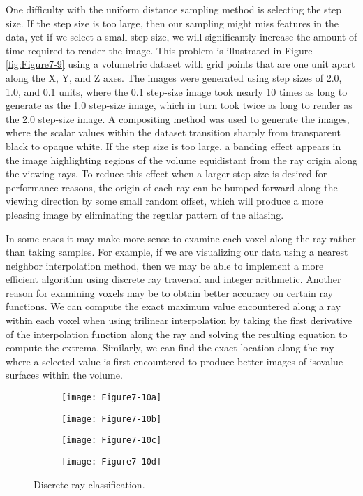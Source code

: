 One difficulty with the uniform distance sampling method is selecting the step size. If the step size is too large, then our sampling might miss features in the data, yet if we select a small step size, we will significantly increase the amount of time required to render the image. This problem is illustrated in Figure \ref{fig:Figure7-9} using a volumetric dataset with grid points that are one unit apart along the X, Y, and Z axes. The images were generated using step sizes of 2.0, 1.0, and 0.1 units, where the 0.1 step-size image took nearly 10 times as long to generate as the 1.0 step-size image, which in turn took twice as long to render as the 2.0 step-size image. A compositing method was used to generate the images, where the scalar values within the dataset transition sharply from transparent black to opaque white. If the step size is too large, a banding effect appears in the image highlighting regions of the volume equidistant from the ray origin along the viewing rays. To reduce this effect when a larger step size is desired for performance reasons, the origin of each ray can be bumped forward along the viewing direction by some small random offset, which will produce a more pleasing image by eliminating the regular pattern of the aliasing.

In some cases it may make more sense to examine each voxel along the ray rather than taking samples. For example, if we are visualizing our data using a nearest neighbor interpolation method, then we may be able to implement a more efficient algorithm using discrete ray traversal and integer arithmetic. Another reason for examining voxels may be to obtain better accuracy on certain ray functions. We can compute the exact maximum value encountered along a ray within each voxel when using trilinear interpolation by taking the first derivative of the interpolation function along the ray and solving the resulting equation to compute the extrema. Similarly, we can find the exact location along the ray where a selected value is first encountered to produce better images of isovalue surfaces within the volume.

\begin{figure}[!htb]
	\begin{subfigure}[h]{0.24\linewidth}
		\texttt{[image: Figure7-10a]}
		\caption*{}\label{fig:Figure7-10a}
	\end{subfigure}
	\hfill
	\begin{subfigure}[h]{0.24\linewidth}
		\texttt{[image: Figure7-10b]}
		\caption*{}\label{fig:Figure7-10b}
	\end{subfigure}%
	\hfill
	\begin{subfigure}[h]{0.24\linewidth}
		\texttt{[image: Figure7-10c]}
		\caption*{}\label{fig:Figure7-10c}
	\end{subfigure}%
	\hfill
	\begin{subfigure}[h]{0.24\linewidth}
		\texttt{[image: Figure7-10d]}
		\caption*{}\label{fig:Figure7-10d}
	\end{subfigure}%
	\caption{Discrete ray classification.}\label{fig:Figure7-10}
\end{figure}

